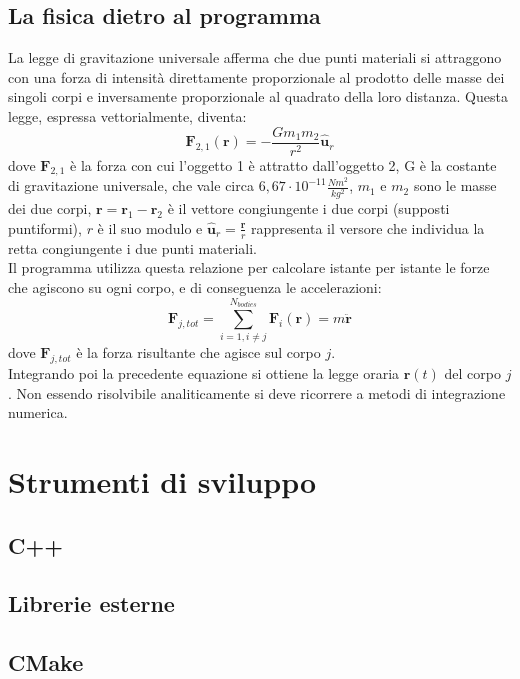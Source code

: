 \documentclass{article}
\begin{document}
\subsection{La fisica dietro al programma}
La legge di gravitazione universale afferma che due punti materiali si attraggono con una forza di intensità direttamente proporzionale al prodotto delle masse dei singoli corpi e inversamente proporzionale al quadrato della loro distanza. Questa legge, espressa vettorialmente, diventa:
\begin{equation}
\textbf{F}_{2,1}(\textbf{r})=-\frac{Gm_{1}m_{2}}{r^{2}}\hat{\textbf{u}}_{r}
\end{equation}
dove $\textbf{F}_{2,1}$ è la forza con cui l'oggetto 1 è attratto dall'oggetto 2, G è la costante di gravitazione universale, che vale circa $6,67\cdot 10^{-11}\frac{Nm^2}{kg^2}$, $m_1$ e $m_2$ sono le masse dei due corpi, $\textbf{r}=\textbf{r}_1-\textbf{r}_2$ è il vettore congiungente i due corpi (supposti puntiformi), 
$r$ è il suo modulo e $\hat{\textbf{u}}_{r}=\frac{\textbf{r}}{r}$ rappresenta il versore che individua la retta congiungente i due punti materiali.\\
Il programma utilizza questa relazione per calcolare istante per istante le forze che agiscono su ogni corpo, e di conseguenza le accelerazioni:
\begin{equation}
\textbf{F}_{j,tot}=\sum_{i=1, i\neq j}^{N_{bodies}}\textbf{F}_{i}(\textbf{r})=m\ddot{\textbf{r}}
\end{equation}
dove $\textbf{F}_{j,tot}$ è la forza risultante che agisce sul corpo $j$.\\
Integrando poi la precedente equazione si ottiene la legge oraria $\textbf{r}(t)$ del corpo $j$. Non essendo risolvibile analiticamente si deve ricorrere a metodi di integrazione numerica.


\section{Strumenti di sviluppo}
\subsection{C++}
\subsection{Librerie esterne}

\subsection{CMake}
\end{document}

